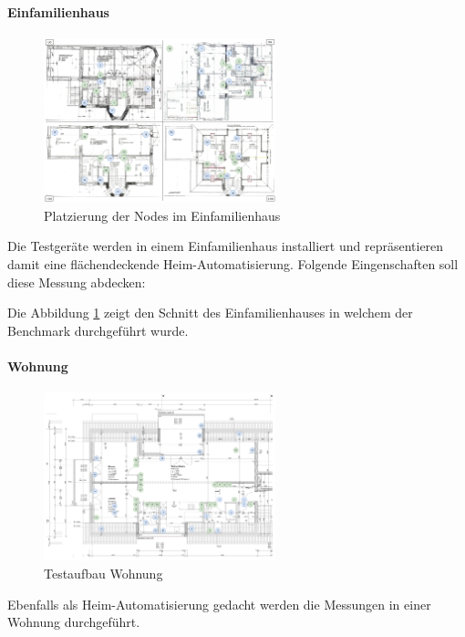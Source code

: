\paragraph{Einfamilienhaus}
\begin{figure}
	\centering
	\vspace{-105pt}
	\includegraphics[width=0.6\textwidth]{graphics/Plan_Haus_Raffi.png}
	\caption{Platzierung der Nodes im Einfamilienhaus}\label{fig:Messumgebung2Einfamilienhaus}
	\vspace{-50pt}
\end{figure}
Die Testgeräte werden in einem Einfamilienhaus installiert und repräsentieren damit eine flächendeckende Heim-Automatisierung. Folgende Eingenschaften soll diese Messung abdecken:

Die Abbildung \ref{fig:Messumgebung2Einfamilienhaus} zeigt den Schnitt des Einfamilienhauses in welchem der Benchmark durchgeführt wurde.

\newpage
\paragraph{Wohnung}
\begin{figure}
	\centering
	\vspace{-90pt}
	\includegraphics[width=0.6\textwidth]{graphics/Plan_Wohnung_Cyrill_Nodes_Placement.png}
	\caption{Testaufbau Wohnung}
	\label{fig:TestaufbauWohnung}
	\vspace{-100pt}
\end{figure}
Ebenfalls als Heim-Automatisierung gedacht werden die Messungen in einer Wohnung durchgeführt.


